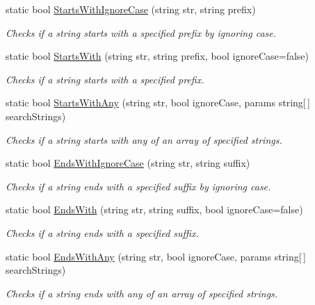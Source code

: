 \begin{DoxyCompactItemize}
static bool \hyperlink{class_ultimate_1_1_utilities_1_1_string_utils_a2cf3d367906050f4bda93526fd1f8bc8}{Starts\+With\+Ignore\+Case} (string str, string prefix)
\begin{DoxyCompactList}\small\item\em Checks if a string starts with a specified prefix by ignoring case. \end{DoxyCompactList}\item 
static bool \hyperlink{class_ultimate_1_1_utilities_1_1_string_utils_ae445d10e25a5e8b8df4e6a17aaca83ec}{Starts\+With} (string str, string prefix, bool ignore\+Case=false)
\begin{DoxyCompactList}\small\item\em Checks if a string starts with a specified prefix. \end{DoxyCompactList}\item 
static bool \hyperlink{class_ultimate_1_1_utilities_1_1_string_utils_ad387de239ebf39911ab94b855defe5e9}{Starts\+With\+Any} (string str, bool ignore\+Case, params string\mbox{[}$\,$\mbox{]} search\+Strings)
\begin{DoxyCompactList}\small\item\em Checks if a string starts with any of an array of specified strings. \end{DoxyCompactList}\item 
static bool \hyperlink{class_ultimate_1_1_utilities_1_1_string_utils_ad67ae58047256adc6d5d136de13398b0}{Ends\+With\+Ignore\+Case} (string str, string suffix)
\begin{DoxyCompactList}\small\item\em Checks if a string ends with a specified suffix by ignoring case. \end{DoxyCompactList}\item 
static bool \hyperlink{class_ultimate_1_1_utilities_1_1_string_utils_a6c11e45b223473e3a6a03a33bfecdd95}{Ends\+With} (string str, string suffix, bool ignore\+Case=false)
\begin{DoxyCompactList}\small\item\em Checks if a string ends with a specified suffix. \end{DoxyCompactList}\item 
static bool \hyperlink{class_ultimate_1_1_utilities_1_1_string_utils_a2946f4183a80dc34a421b6206b27a668}{Ends\+With\+Any} (string str, bool ignore\+Case, params string\mbox{[}$\,$\mbox{]} search\+Strings)
\begin{DoxyCompactList}\small\item\em Checks if a string ends with any of an array of specified strings. \end{DoxyCompactList}\item 

\end{DoxyCompactItemize}
